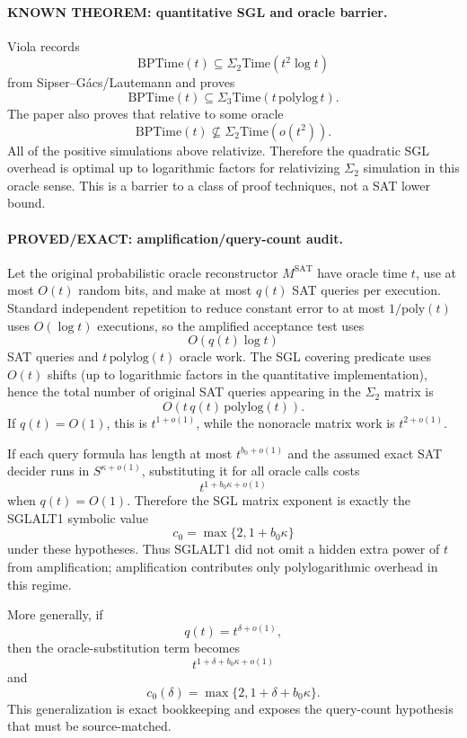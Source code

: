 \documentclass[11pt]{article}
\begin{document}
\paragraph{KNOWN THEOREM: quantitative SGL and oracle barrier.}
Viola records
\[
\mathrm{BPTime}(t)\subseteq\Sigma_2\mathrm{Time}(t^2\log t)
\]
from Sipser--G\'acs/Lautemann and proves
\[
\mathrm{BPTime}(t)\subseteq\Sigma_3\mathrm{Time}(t\,\mathrm{polylog}\,t).
\]
The paper also proves that relative to some oracle
\[
\mathrm{BPTime}(t)\not\subseteq\Sigma_2\mathrm{Time}(o(t^2)).
\]
All of the positive simulations above relativize. Therefore the quadratic SGL overhead is optimal up to logarithmic factors for relativizing $\Sigma_2$ simulation in this oracle sense. This is a barrier to a class of proof techniques, not a SAT lower bound.

\paragraph{PROVED/EXACT: amplification/query-count audit.}
Let the original probabilistic oracle reconstructor $M^{\mathrm{SAT}}$ have oracle time $t$, use at most $O(t)$ random bits, and make at most $q(t)$ SAT queries per execution. Standard independent repetition to reduce constant error to at most $1/\mathrm{poly}(t)$ uses $O(\log t)$ executions, so the amplified acceptance test uses
\[
O(q(t)\log t)
\]
SAT queries and $t\,\mathrm{polylog}(t)$ oracle work. The SGL covering predicate uses $O(t)$ shifts (up to logarithmic factors in the quantitative implementation), hence the total number of original SAT queries appearing in the $\Sigma_2$ matrix is
\[
\boxed{O(t\,q(t)\,\mathrm{polylog}(t)).}
\]
If $q(t)=O(1)$, this is $t^{1+o(1)}$, while the nonoracle matrix work is $t^{2+o(1)}$.

If each query formula has length at most $t^{b_0+o(1)}$ and the assumed exact SAT decider runs in $S^{\kappa+o(1)}$, substituting it for all oracle calls costs
\[
t^{1+b_0\kappa+o(1)}
\]
when $q(t)=O(1)$. Therefore the SGL matrix exponent is exactly the SGLALT1 symbolic value
\[
\boxed{c_0=\max\{2,1+b_0\kappa\}}
\]
under these hypotheses. Thus SGLALT1 did not omit a hidden extra power of $t$ from amplification; amplification contributes only polylogarithmic overhead in this regime.

More generally, if
\[
q(t)=t^{\delta+o(1)},
\]
then the oracle-substitution term becomes
\[
t^{1+\delta+b_0\kappa+o(1)}
\]
and
\[
\boxed{c_0(\delta)=\max\{2,1+\delta+b_0\kappa\}.}
\]
This generalization is exact bookkeeping and exposes the query-count hypothesis that must be source-matched.
\end{document}
